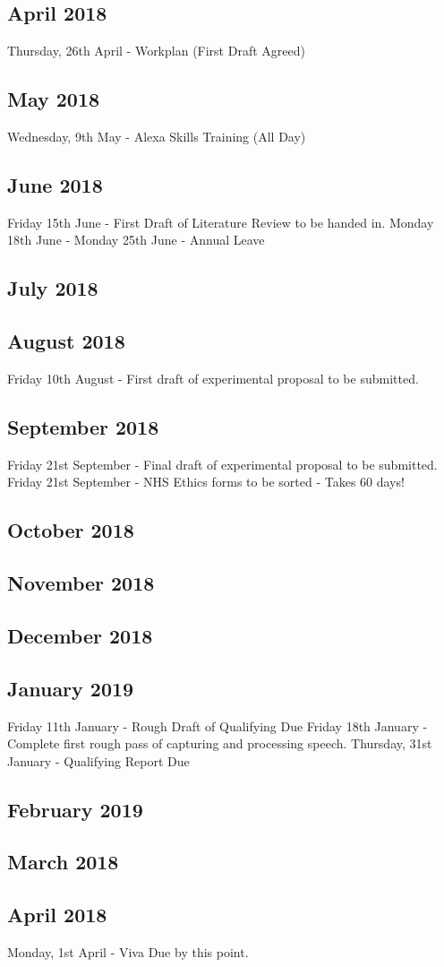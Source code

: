 \documentclass{article}
\begin{document}
	\subsection{April 2018}
	Thursday, 26th April - Workplan (First Draft Agreed)
	\subsection{May 2018}
	Wednesday, 9th May - Alexa Skills Training (All Day)
	\subsection{June 2018}
	Friday 15th June - First Draft of Literature Review to be handed in.
	\newline
	Monday 18th June - Monday 25th June - Annual Leave
	\subsection{July 2018}
	
	\subsection{August 2018}
	Friday 10th August - First draft of experimental proposal to be submitted.
	
	
	\subsection{September 2018}
	Friday 21st September - Final draft of experimental proposal to be submitted. 
	Friday 21st September - NHS Ethics forms to be sorted  - Takes 60 days!
	\subsection{October 2018}

	\subsection{November 2018}
	
	\subsection{December 2018}	
	
	\subsection{January 2019}
	Friday 11th January - Rough Draft of Qualifying Due
	Friday 18th January - Complete first rough pass of capturing and processing speech.
	Thursday, 31st January - Qualifying Report Due
	
	\subsection{February 2019}

	
	\subsection{March 2018}
	
	\subsection{April 2018}
	Monday, 1st April - Viva Due by this point.
\end{document}
